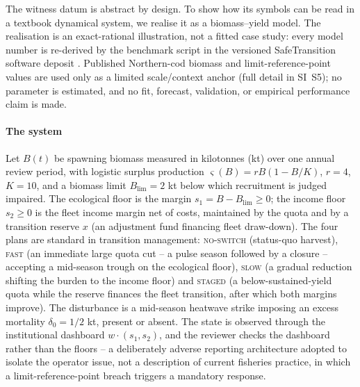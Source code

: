 \documentclass[preprint,11pt,authoryear]{elsarticle}
\theoremstyle{definition}
\theoremstyle{remark}
\newcommand{\act}[1]{\textsc{#1}}
\begin{document}
The witness datum is abstract by design. To show how its symbols can be read in a textbook dynamical system, we realise it as a \citet{Schaefer1954} biomass--yield model. The realisation is an exact-rational illustration, not a fitted case study: every model number is re-derived by the benchmark script in the versioned SafeTransition software deposit \citep{Abaee2026software}. Published Northern-cod biomass and limit-reference-point values are used only as a limited scale/context anchor (full detail in SI~S5); no parameter is estimated, and no fit, forecast, validation, or empirical performance claim is made.

\paragraph{The system} Let $B(t)$ be spawning biomass measured in kilotonnes (kt) over one annual review period, with logistic surplus production $\varsigma(B)=rB(1-B/K)$, $r=4$, $K=10$, and a biomass limit $B_{\mathrm{lim}}=2$ kt below which recruitment is judged impaired. The ecological floor is the margin $s_1=B-B_{\mathrm{lim}}\ge0$; the income floor $s_2\ge0$ is the fleet income margin net of costs, maintained by the quota and by a transition reserve $x$ (an adjustment fund financing fleet draw-down). The four plans are standard in transition management: \act{no-switch} (status-quo harvest), \act{fast} (an immediate large quota cut -- a pulse season followed by a closure -- accepting a mid-season trough on the ecological floor), \act{slow} (a gradual reduction shifting the burden to the income floor) and \act{staged} (a below-sustained-yield quota while the reserve finances the fleet transition, after which both margins improve). The disturbance is a mid-season heatwave strike imposing an excess mortality $\delta_0=1/2$ kt, present or absent. The state is observed through the institutional dashboard $w\cdot(s_1,s_2)$, and the reviewer checks the dashboard rather than the floors -- a deliberately adverse reporting architecture adopted to isolate the operator issue, not a description of current fisheries practice, in which a limit-reference-point breach triggers a mandatory response.
\end{document}

